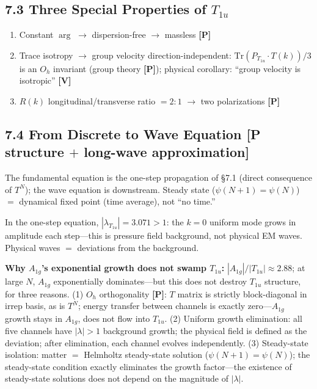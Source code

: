 \documentclass[11pt,a4paper]{article}
\newcommand{\gradeP}{\textbf{[P]}}
\newcommand{\gradeV}{\textbf{[V]}}
\begin{document}
\subsection{7.3 Three Special Properties of $T_{1u}$}

\begin{enumerate}[nosep]
\item Constant $\arg$ $\to$ dispersion-free $\to$ massless \gradeP
\item Trace isotropy $\to$ group velocity direction-independent: $\mathrm{Tr}(P_{T_{1u}}\cdot T(k))/3$ is an $O_h$ invariant (group theory \gradeP); physical corollary: ``group velocity is isotropic'' \gradeV
\item $R(k)$ longitudinal/transverse ratio $= 2:1$ $\to$ two polarizations \gradeP
\end{enumerate}

\subsection{7.4 From Discrete to Wave Equation [P structure $+$ long-wave approximation]}

The fundamental equation is the one-step propagation of \S7.1 (direct consequence of $T^N$); the wave equation is downstream. Steady state ($\psi(N+1)=\psi(N)$) $=$ dynamical fixed point (time average), not ``no time.''

In the one-step equation, $|\lambda_{T_{1u}}|=3.071>1$: the $k=0$ uniform mode grows in amplitude each step---this is pressure field background, not physical EM waves. Physical waves $=$ deviations from the background.

\textbf{Why $A_{1g}$'s exponential growth does not swamp $T_{1u}$:} $|A_{1g}|/|T_{1u}|\approx 2.88$; at large $N$, $A_{1g}$ exponentially dominates---but this does not destroy $T_{1u}$ structure, for three reasons. (1) $O_h$ orthogonality \gradeP: $T$ matrix is strictly block-diagonal in irrep basis, as is $T^N$; energy transfer between channels is exactly zero---$A_{1g}$ growth stays in $A_{1g}$, does not flow into $T_{1u}$. (2) Uniform growth elimination: all five channels have $|\lambda|>1$ background growth; the physical field is defined as the deviation; after elimination, each channel evolves independently. (3) Steady-state isolation: matter $=$ Helmholtz steady-state solution ($\psi(N{+}1)=\psi(N)$); the steady-state condition exactly eliminates the growth factor---the existence of steady-state solutions does not depend on the magnitude of $|\lambda|$.
\end{document}
